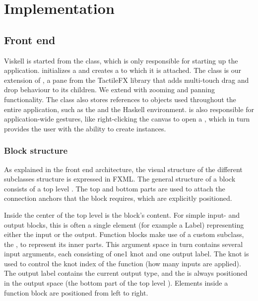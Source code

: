 \chapter{Implementation}
\label{chap:implementation}

\section{Front end}
Viskell is started from the  class, which is only responsible for starting up the application.  initializes a  and creates a  to which it is attached. The  class is our extension of , a pane from the TactileFX library that adds multi-touch drag and drop behaviour to its children. We extend  with zooming and panning functionality. The class also stores references to objects used throughout the entire application, such as the  and the Haskell environment.  is also responsible for application-wide gestures, like right-clicking the canvas to open a , which in turn provides the user with the ability to create  instances.

\subsection{Block structure}
As explained in the front end architecture, the visual structure of the different  subclasses structure is expressed in \gls{FXML}. The general structure of a block consists of a top level . The top and bottom parts are used to attach the connection anchors that the block requires, which are explicitly positioned.

Inside the center of the top level  is the block's content. For simple input- and output blocks, this is often a single element (for example a Label) representing either the input or the output. Function blocks make use of a custom  subclass, the , to represent its inner parts. This argument space in turn contains several input arguments, each consisting of one1 knot and one output label. The knot is used to control the knot index of the function (how many inputs are applied). The output label contains the current output type, and the  is always positioned in the output space (the bottom part of the top level ). Elements inside a function block are positioned from left to right.

